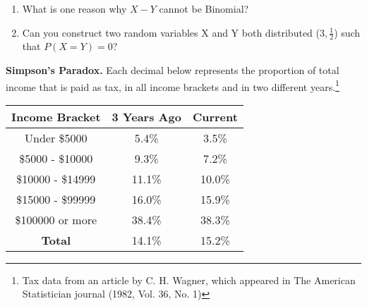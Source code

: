 \documentclass[11pt]{article}
\theoremstyle{definition}
\theoremstyle{remark}
\newcommand{\Bin}{\text{Bin}}
\begin{document}
\begin{enumerate}
        \item What is one reason why $X - Y$ cannot be Binomial?
    

  
        \item Can you construct two random variables X and Y both distributed \Bin($3, \frac{1}{2}$) such that $P(X=Y)=0$?
        
        
        
\end{enumerate}

\newpage
        
\example \textbf{Simpson's Paradox.} Each decimal below represents the proportion of total income that is paid as tax, in all income brackets and in two different years.\footnote{Tax data from an article by C. H. Wagner, which appeared in The American Statistician journal (1982, Vol. 36, No. 1)}

\begin{center}
    \begin{tabular}{ccc}
          \bf{Income Bracket} &  \bf{3 Years Ago} & \bf{Current} \\ \hline
        Under \$5000 & 5.4\% & 3.5\% \\
        \$5000 - \$10000 & 9.3\% & 7.2\% \\
        \$10000 - \$14999 & 11.1\% & 10.0\% \\
        \$15000 - \$99999 & 16.0\% & 15.9\% \\
        \$100000 or more & 38.4\% & 38.3\% \\ \hline
        \bf{Total} & 14.1\% & 15.2\% \\
    \end{tabular}
    \end{center}
    
\end{document}
